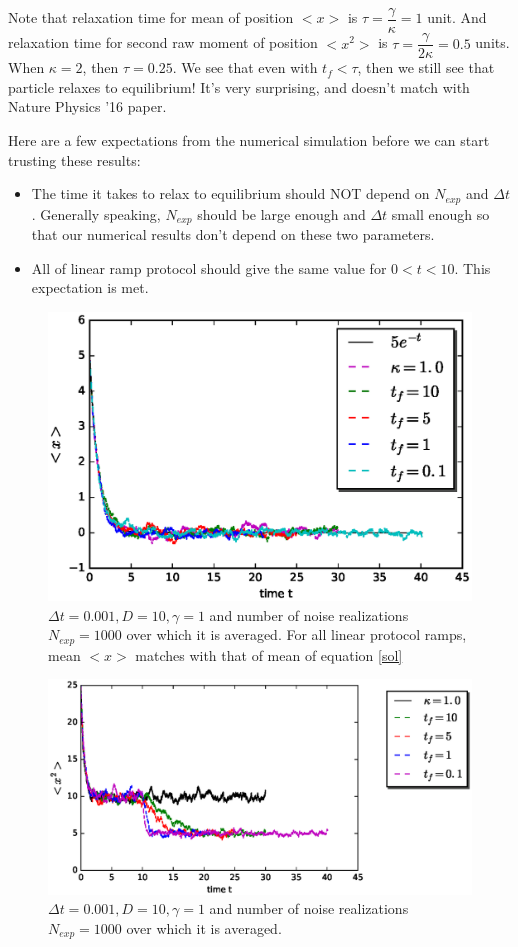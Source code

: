 \documentclass[11pt,a4paper]{article}
\begin{document}
Note that relaxation time for mean of position $<x>$ is  $\tau=\dfrac{\gamma}{\kappa}=1$ unit. And relaxation time for second raw moment of position $<x^2>$ is  $\tau=\dfrac{\gamma}{2\kappa}=0.5$ units. 
When $\kappa=2$, then $\tau=0.25$. We see that even with $t_f<\tau$, then we still see that particle relaxes to equilibrium! It's very surprising, and doesn't match with Nature Physics '16 paper.


Here are a few expectations from the numerical simulation before we can start trusting these results:
\begin{itemize}
\item The time it takes to relax to equilibrium should NOT depend on $N_{exp}$ and $\Delta t$. Generally speaking, $N_{exp}$ should be large enough and $\Delta t$ small enough so that our numerical results don't depend on these two parameters.
\item All of linear ramp protocol should give the same value for $0<t<10$. This expectation is met. 
\end{itemize}
\begin{figure}[!htbp]
\centering
\includegraphics[scale=0.67]{ramp_mean.eps}
\caption{ $\Delta t=0.001, D=10, \gamma=1$ and number of noise realizations $N_{exp}=1000$ over which it is averaged. For all linear protocol ramps, mean $<x>$ matches with that of mean of equation \ref{sol}}
\label{ramp_mean}
\end{figure}


\begin{figure}[!htbp]
\centering
\includegraphics[scale=0.67]{ramp_sigma.eps}
\caption{ $\Delta t=0.001, D=10, \gamma=1$  and number of noise realizations $N_{exp}=1000$ over which it is averaged. }
\label{sigma_ramp}
\end{figure}
\end{document}
